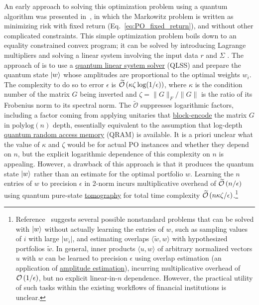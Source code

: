 \begin{refsection}
An early approach to solving this optimization problem using a quantum algorithm was presented in~\cite{rebentrost2018QuantumFinance}, in which the Markowitz problem is written as minimizing risk with fixed return (Eq.~\eqref{eq:PO_fixed_return}), and without other complicated constraints. This simple optimization problem boils down to an equality constrained convex program; it can be solved by introducing Lagrange multipliers and solving a linear system involving the input data $r$ and $\Sigma$ \cite{rebentrost2018QuantumFinance}. The approach of \cite{rebentrost2018QuantumFinance} is to use a  \hyperref[prim:QuantumLinearSystemSolvers]{quantum linear system solver} (QLSS) and prepare the quantum state $\lvert w\rangle$ whose amplitudes are proportional to the optimal weights $w_i$. The complexity to do so to error $\epsilon$ is $\widetilde{\mathcal{O}}\left( \kappa\zeta\log(1/\epsilon) \right)$, where $\kappa$ is the condition number of the matrix $G$ being inverted and $\zeta = \lVert G \rVert_F/\lVert G \rVert$ is the ratio of its Frobenius norm to its spectral norm. The $\tilde{\mathcal{O}}$ suppresses logarithmic factors, including a factor coming from applying unitaries that \hyperref[prim:BlockEncodingsClassical]{block-encode} the matrix $G$ in $\mathrm{polylog}(n)$ depth, essentially equivalent to the assumption that log-depth \hyperref[prim:QRAM]{quantum random access memory} (QRAM) is available. It is a priori unclear what the value of $\kappa$ and $\zeta$ would be for actual PO instances and whether they depend on $n$, but the explicit logarithmic dependence of this complexity on $n$ is appealing. 
However, a drawback of this approach is that it produces the quantum state $\lvert w\rangle$ rather than an estimate for the optimal portfolio $w$. Learning the $n$ entries of $w$ to precision $\epsilon$ in 2-norm incurs multiplicative overhead of $\widetilde{\mathcal{O}}\left( n/\epsilon \right)$ using quantum pure-state \hyperref[prim:Tomography]{tomography} \cite{apeldoorn2022TomographyStatePreparationUnitaries} for total time complexity $\widetilde{\mathcal{O}}\left( n\kappa\zeta/\epsilon \right)$.\footnote{Reference~\cite{rebentrost2018QuantumFinance} suggests several possible nonstandard problems that can be solved with $\lvert w\rangle$ without actually learning the entries of $w$, such as sampling values of $i$ with large $|w_i|$, and estimating overlaps $\langle \tilde{w}, w \rangle$ with hypothesized portfolios $\tilde{w}$. In general, inner products $\langle u, w \rangle$ of arbitrary normalized vectors $u$ with $w$ can be learned to precision $\epsilon$ using overlap estimation \cite{knill2007ObservableMeasurement} (an application of \hyperref[prim:AmpAmp]{amplitude estimation}), incurring multiplicative overhead of $\mathcal{O}\left( 1/\epsilon \right)$, but no explicit linear-in-$n$ dependence. However, the practical utility of such tasks within the existing workflows of financial institutions is unclear.} 



\end{refsection}
